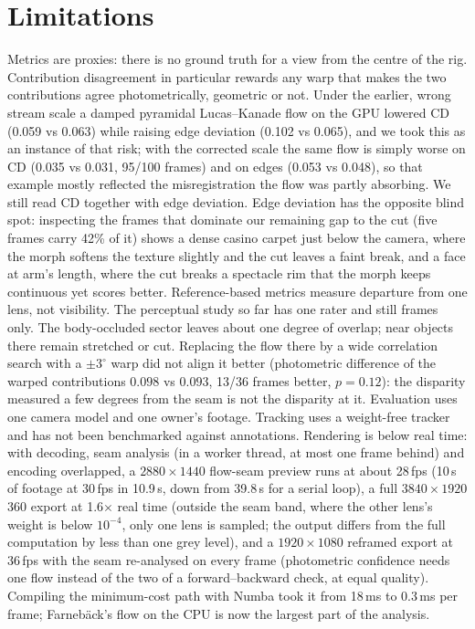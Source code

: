 \documentclass[11pt]{article}
\begin{document}
\section{Limitations}

Metrics are proxies: there is no ground truth for a view from the centre of the rig. Contribution disagreement in particular rewards any warp that makes the two contributions agree photometrically, geometric or not. Under the earlier, wrong stream scale a damped pyramidal Lucas--Kanade flow on the GPU lowered CD (0.059 vs 0.063) while raising edge deviation (0.102 vs 0.065), and we took this as an instance of that risk; with the corrected scale the same flow is simply worse on CD (0.035 vs 0.031, 95/100 frames) and on edges (0.053 vs 0.048), so that example mostly reflected the misregistration the flow was partly absorbing. We still read CD together with edge deviation. Edge deviation has the opposite blind spot: inspecting the frames that dominate our remaining gap to the cut (five frames carry 42\% of it) shows a dense casino carpet just below the camera, where the morph softens the texture slightly and the cut leaves a faint break, and a face at arm's length, where the cut breaks a spectacle rim that the morph keeps continuous yet scores better. Reference-based metrics measure departure from one lens, not visibility. The perceptual study so far has one rater and still frames only. The body-occluded sector leaves about one degree of overlap; near objects there remain stretched or cut. Replacing the flow there by a wide correlation search with a $\pm3^\circ$ warp did not align it better (photometric difference of the warped contributions $0.098$ vs $0.093$, 13/36 frames better, $p=0.12$): the disparity measured a few degrees from the seam is not the disparity at it. Evaluation uses one camera model and one owner's footage. Tracking uses a weight-free tracker and has not been benchmarked against annotations. Rendering is below real time: with decoding, seam analysis (in a worker thread, at most one frame behind) and encoding overlapped, a $2880\times1440$ flow-seam preview runs at about 28\,fps (10\,s of footage at 30\,fps in 10.9\,s, down from 39.8\,s for a serial loop), a full $3840\times1920$ 360\textdegree{} export at 1.6$\times$ real time (outside the seam band, where the other lens's weight is below $10^{-4}$, only one lens is sampled; the output differs from the full computation by less than one grey level), and a $1920\times1080$ reframed export at 36\,fps with the seam re-analysed on every frame (photometric confidence needs one flow instead of the two of a forward--backward check, at equal quality). Compiling the minimum-cost path with Numba took it from 18\,ms to 0.3\,ms per frame; Farneb\"ack's flow on the CPU is now the largest part of the analysis.
\end{document}

